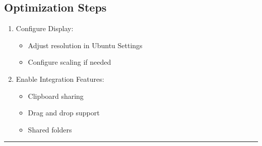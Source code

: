 \documentclass[11pt,a4paper]{article}
\begin{document}
\subsection{Optimization Steps}
\begin{enumerate}
    \item Configure Display:
    \begin{itemize}
        \item Adjust resolution in Ubuntu Settings
        \item Configure scaling if needed
    \end{itemize}
    \item Enable Integration Features:
    \begin{itemize}
        \item Clipboard sharing
        \item Drag and drop support
        \item Shared folders
    \end{itemize}
\end{enumerate}

\noindent\rule{\textwidth}{1pt}



\end{document}
